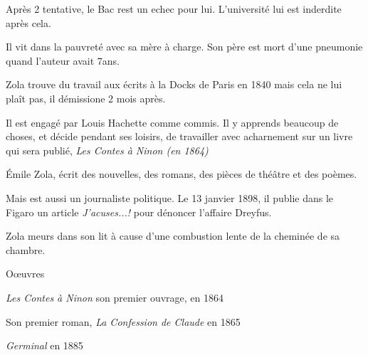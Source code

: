 \documentclass[12pt,a4paper]{article}
\begin{document}
\begin{cursive}
 Après 2 tentative, le Bac rest un echec pour lui. L'université lui est inderdite après cela.\par
{} Il vit dans la pauvreté avec sa mère à charge. Son père est mort d'une pneumonie quand l'auteur avait 7ans.\par
{} Zola trouve du travail aux écrits à la Docks de Paris en 1840 mais cela ne lui pla\^it pas, il démissione 2 mois après.\par
{} Il est engagé par Louis Hachette comme commis. Il y apprends beaucoup de choses, et décide pendant ses loisirs, de travailler avec acharnement sur un livre qui sera publié, \textit{ Les Contes à Ninon (en 1864)}\par
{} \'Emile Zola, écrit des nouvelles, des romans, des pièces de théâtre et des poèmes.\par
{} Mais est aussi un journaliste politique. Le 13 janvier 1898, il publie dans le Figaro un article \textit{J'acuses...!} pour dénoncer l'affaire Dreyfus.\par
{} Zola meurs dans son lit à cause d'une combustion lente de la cheminée de sa chambre. \par

\begin{center}
 O\oe uvres \par
\end{center}


 \textit{Les Contes à Ninon} son premier ouvrage, en 1864\par
{} Son premier roman, \textit{La Confession de Claude} en 1865\par
{} \textit{Germinal} en 1885\par

\end{cursive}
\end{document}
